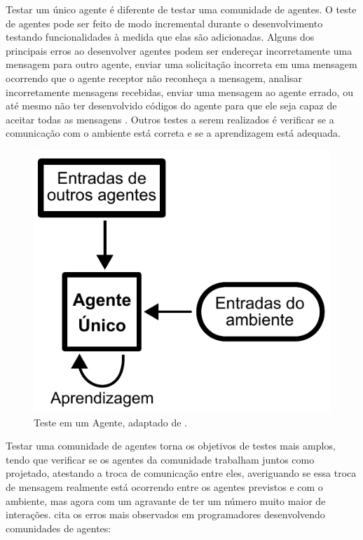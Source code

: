 Testar um único agente é diferente de testar uma comunidade de agentes. O teste de agentes pode ser feito de modo incremental durante o desenvolvimento testando funcionalidades à medida que elas são adicionadas. Alguns dos principais erros ao desenvolver agentes podem ser endereçar incorretamente uma mensagem para outro agente, enviar uma solicitação incorreta em uma mensagem ocorrendo que o agente receptor não reconheça a mensagem, analisar incorretamente mensagens recebidas, enviar uma mensagem ao agente errado, ou até mesmo não ter desenvolvido códigos do agente para que ele seja capaz de aceitar todas as mensagens \cite{rouff2002test}. Outros testes a serem realizados é verificar se a comunicação com o ambiente está correta e se a aprendizagem está adequada.

\begin{figure}[ht]
\centering
\includegraphics[scale=0.7]{imagens/single_agent.pdf}
\caption{Teste em um Agente, adaptado de \cite{rouff2002test}.}
\label{single}
\end{figure}

Testar uma comunidade de agentes torna os objetivos de testes mais amplos, tendo que verificar se os agentes da comunidade trabalham juntos como projetado, atestando a troca de comunicação entre eles, averiguando se essa troca de mensagem realmente está ocorrendo entre os agentes previstos  e  com o ambiente, mas agora com um agravante de ter um número muito maior de interações. \cite{rouff2002test} cita os erros mais observados em programadores desenvolvendo comunidades de agentes:

